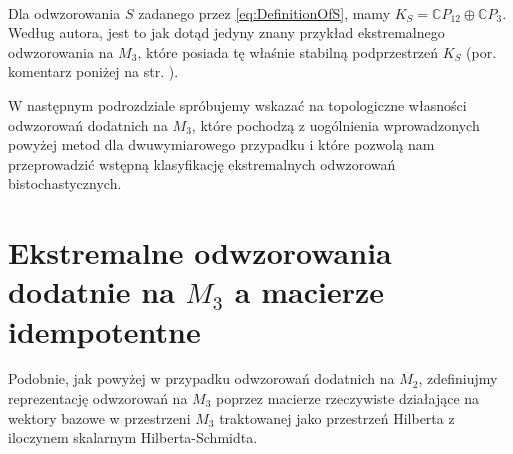 {\paragraph{}

Dla odwzorowania $S$ zadanego przez \eqref{eq:DefinitionOfS}, mamy
$K_{S}= \mathbb{C} P_{12} \oplus \mathbb{C} P_{3}$.
Według autora, jest to jak dotąd jedyny znany przykład ekstremalnego
odwzorowania na $M_{3}$,
które posiada tę właśnie stabilną podprzestrzeń $K_S$
(por. komentarz poniżej na str. \pageref{com:onlyOneExample}).

W następnym podrozdziale spróbujemy wskazać na topologiczne własności
odwzorowań dodatnich na $M_3$, które pochodzą z uogólnienia wprowadzonych
powyżej metod dla dwuwymiarowego przypadku
i które pozwolą nam przeprowadzić wstępną klasyfikację ekstremalnych
odwzorowań bistochastycznych.

\section{Ekstremalne odwzorowania dodatnie na $M_{3}$
a macierze idempotentne}

Podobnie, jak powyżej w przypadku odwzorowań dodatnich na $M_{2}$,
zdefiniujmy reprezentację odwzorowań na $M_{3}$ poprzez macierze
rzeczywiste działające na wektory bazowe w przestrzeni $M_{3}$
traktowanej jako przestrzeń Hilberta z iloczynem skalarnym Hilberta-Schmidta.

}

